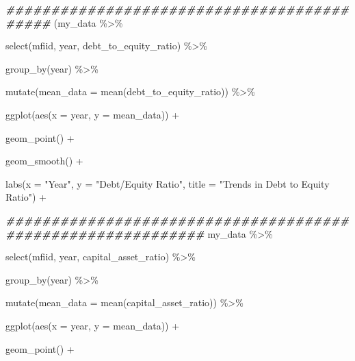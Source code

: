 \documentclass[a4paper,nobind]{templates/ociamthesis}
\newenvironment{Shaded}{\begin{snugshade}}{\end{snugshade}}
\newcommand{\AttributeTok}[1]{\textcolor[rgb]{0.77,0.63,0.00}{#1}}
\newcommand{\DocumentationTok}[1]{\textcolor[rgb]{0.56,0.35,0.01}{\textbf{\textit{#1}}}}
\newcommand{\FunctionTok}[1]{\textcolor[rgb]{0.00,0.00,0.00}{#1}}
\newcommand{\NormalTok}[1]{#1}
\newcommand{\SpecialCharTok}[1]{\textcolor[rgb]{0.00,0.00,0.00}{#1}}
\newcommand{\StringTok}[1]{\textcolor[rgb]{0.31,0.60,0.02}{#1}}
\renewenvironment{Shaded}
{
  \vspace{10pt}%
  \begin{snugshade}%
}{%
  \end{snugshade}%
  \vspace{8pt}%
}
\begin{document}
\begin{landscape}

\begin{Shaded}
\begin{Highlighting}[]
\DocumentationTok{\#\#\#\#\#\#\#\#\#\#\#\#\#\#\#\#\#\#\#\#\#\#\#\#\#\#\#\#\#\#\#\#\#\#\#\#\#\#\#\#\#\#\#}
\NormalTok{(my\_data }\SpecialCharTok{\%\textgreater{}\%} 
  
  \FunctionTok{select}\NormalTok{(mfiid, year, debt\_to\_equity\_ratio) }\SpecialCharTok{\%\textgreater{}\%} 
  
  \FunctionTok{group\_by}\NormalTok{(year) }\SpecialCharTok{\%\textgreater{}\%} 
  
  \FunctionTok{mutate}\NormalTok{(}\AttributeTok{mean\_data =} \FunctionTok{mean}\NormalTok{(debt\_to\_equity\_ratio)) }\SpecialCharTok{\%\textgreater{}\%} 
  
  \FunctionTok{ggplot}\NormalTok{(}\FunctionTok{aes}\NormalTok{(}\AttributeTok{x =}\NormalTok{ year, }\AttributeTok{y =}\NormalTok{ mean\_data)) }\SpecialCharTok{+} 
  
  \FunctionTok{geom\_point}\NormalTok{() }\SpecialCharTok{+} 
  
  \FunctionTok{geom\_smooth}\NormalTok{() }\SpecialCharTok{+} 
  
  \FunctionTok{labs}\NormalTok{(}\AttributeTok{x =} \StringTok{"Year"}\NormalTok{, }\AttributeTok{y =} \StringTok{"Debt/Equity Ratio"}\NormalTok{, }\AttributeTok{title =} \StringTok{"Trends in Debt to Equity Ratio"}\NormalTok{) }\SpecialCharTok{+}

\DocumentationTok{\#\#\#\#\#\#\#\#\#\#\#\#\#\#\#\#\#\#\#\#\#\#\#\#\#\#\#\#\#\#\#\#\#\#\#\#\#\#\#\#\#\#\#\#\#\#\#\#\#\#\#\#\#\#\#\#\#\#\#\#}
\NormalTok{my\_data }\SpecialCharTok{\%\textgreater{}\%} 
  
  \FunctionTok{select}\NormalTok{(mfiid, year, capital\_asset\_ratio) }\SpecialCharTok{\%\textgreater{}\%} 
  
  \FunctionTok{group\_by}\NormalTok{(year) }\SpecialCharTok{\%\textgreater{}\%} 
  
  \FunctionTok{mutate}\NormalTok{(}\AttributeTok{mean\_data =} \FunctionTok{mean}\NormalTok{(capital\_asset\_ratio)) }\SpecialCharTok{\%\textgreater{}\%} 
  
  \FunctionTok{ggplot}\NormalTok{(}\FunctionTok{aes}\NormalTok{(}\AttributeTok{x =}\NormalTok{ year, }\AttributeTok{y =}\NormalTok{ mean\_data)) }\SpecialCharTok{+} 
  
  \FunctionTok{geom\_point}\NormalTok{() }\SpecialCharTok{+} 
  

\end{Highlighting}
\end{Shaded}
\end{landscape}
\end{document}
